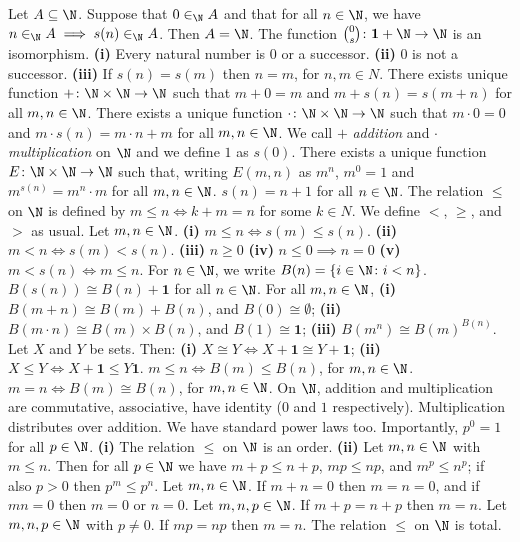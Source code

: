  Let $A \subseteq \N$. Suppose that $0 \in_{\N} A$ and that for all $n \in \N$, we have $n \in_{\N} A \implies s(n) \in_{\N} A$. Then $A = \N$.
 The function $\binom{0}{s} \colon \mathbf{1} + \N \to \N$ is an isomorphism.
 \textbf{(i)} Every natural number is $0$ or a successor. \textbf{(ii)} $0$ is not a successor. \textbf{(iii)} If $s(n) = s(m)$ then $n = m$, for $n, m \in N$.
 There exists unique function $+ \colon \N \times \N \to \N$ such that $m + 0 = m$ and $m + s(n) = s (m + n)$ for all $m, n \in \N$.
 There exists a unique function $\cdot \colon \N \times \N \to \N$ such that $m \cdot 0 = 0$ and $m \cdot s(n) = m \cdot n + m$ for all $m, n \in \N$.
 We call $+$ \textit{addition} and $\cdot$ \textit{multiplication} on $\N$ and we define $1$ as $s(0)$.
 There exists a unique function $E \colon \N \times \N \to \N$ such that, writing $E(m, n)$ as $m^n$, $m^0 = 1$ and $m^{s(n)} = m^n \cdot m$ for all $m, n \in \N$.
 $s(n) = n + 1$ for all $n \in \N$.
 The relation $\leq$ on $\N$ is defined by $m \leq n \iff k + m = n$ for some $k \in N$. We define $<$, $\geq$, and $>$ as usual.
 Let $m, n \in \N$. \textbf{(i)} $m \leq n \iff s(m) \leq s(n)$. \textbf{(ii)} $m < n \iff s(m) < s(n)$. \textbf{(iii)} $n \geq 0$ \textbf{(iv)} $n \leq 0 \implies n = 0$ \textbf{(v)} $m < s(n) \iff m \leq n$.
 For $n \in \N$, we write $B(n) = \{ i \in \N \colon i < n \}$.
 $B(s(n)) \cong B(n) + \mathbf{1}$ for all $n \in \N$.
 For all $m, n \in \N$, \textbf{(i)} $B(m + n) \cong B(m) + B(n)$, and $B(0) \cong \emptyset$; \textbf{(ii)} $B(m \cdot n) \cong B(m) \times B(n)$, and $B(1) \cong \mathbf{1}$; \textbf{(iii)} $B(m^n) \cong B(m)^{B(n)}$.
 Let $X$ and $Y$ be sets. Then: \textbf{(i)} $X \cong Y \iff X + \mathbf{1} \cong Y + \mathbf{1}$; \textbf{(ii)} $X \leq Y \iff X + \mathbf{1} \leq Y \mathbf{1}$.
 $m \leq n \iff B(m) \leq B(n)$, for $m, n \in \N$.
 $m = n \iff B(m) \cong B(n)$, for $m, n \in \N$.
 On $\N$, addition and multiplication are commutative, associative, have identity ($0$ and $1$ respectively). Multiplication distributes over addition. We have standard power laws too. Importantly, $p^0 = 1$ for all $p \in \N$.
 \textbf{(i)} The relation $\leq$ on $\N$ is an order. \textbf{(ii)} Let $m, n \in \N$ with $m \leq n$. Then for all $p \in \N$ we have $m + p \leq n + p$, $mp \leq np$, and $m^p \leq n^p$; if also $p > 0$ then $p^m \leq p^n$.
 Let $m, n \in \N$. If $m + n = 0$ then $m = n = 0$, and if $mn = 0$ then $m = 0$ or $n = 0$.
 Let $m, n, p \in \N$. If $m + p = n + p$ then $m = n$.
 Let $m, n, p \in \N$ with $p \neq 0$. If $m p = n p$ then $m = n$.
 The relation $\leq$ on $\N$ is total.

